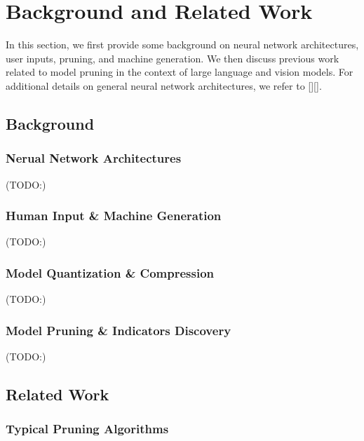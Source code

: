 \documentclass{article} %
\begin{document}
\section{Background and Related Work}
\label{background}

In this section, we first provide some background on neural network architectures, user inputs, pruning, and machine generation. We then discuss previous work related to model pruning in the context of large language and vision models. For additional details on general neural network architectures, we refer to [][].

\subsection{Background}
\subsubsection{Nerual Network Architectures}

(TODO:)

\subsubsection{Human Input \& Machine Generation}

(TODO:)

\subsubsection{Model Quantization \& Compression}

(TODO:)

\subsubsection{Model Pruning \& Indicators Discovery}

(TODO:)

\subsection{Related Work}
\subsubsection{Typical Pruning Algorithms}
\end{document}
